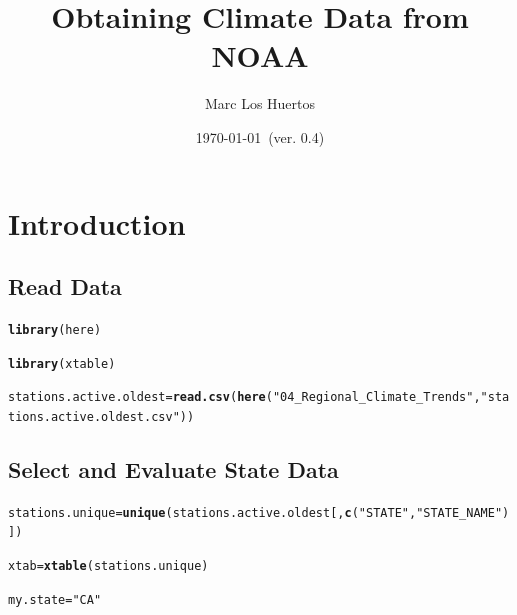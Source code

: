 \documentclass{article}\usepackage[]{graphicx}\usepackage[]{xcolor}
\title{Obtaining Climate Data from NOAA}
\author{Marc Los Huertos}
\date{\today~(ver. 0.4)}
\makeatletter
\newcommand{\hlstr}[1]{\textcolor[rgb]{0.192,0.494,0.8}{#1}}%
\newcommand{\hlstd}[1]{\textcolor[rgb]{0.345,0.345,0.345}{#1}}%
\newcommand{\hlkwb}[1]{\textcolor[rgb]{0.69,0.353,0.396}{#1}}%
\newcommand{\hlkwd}[1]{\textcolor[rgb]{0.737,0.353,0.396}{\textbf{#1}}}%
\newenvironment{kframe}{%
 \def\at@end@of@kframe{}%
 \ifinner\ifhmode%
  \def\at@end@of@kframe{\end{minipage}}%
  \begin{minipage}{\columnwidth}%
 \fi\fi%
 \def\FrameCommand##1{\hskip\@totalleftmargin \hskip-\fboxsep
 \colorbox{shadecolor}{##1}\hskip-\fboxsep
     \hskip-\linewidth \hskip-\@totalleftmargin \hskip\columnwidth}%
 \MakeFramed {\advance\hsize-\width
   \@totalleftmargin\z@ \linewidth\hsize
   \@setminipage}}%
 {\par\unskip\endMakeFramed%
 \at@end@of@kframe}
\newenvironment{knitrout}{}{} %
\makeatother
\begin{document}
\maketitle

\section{Introduction}

\subsection{Read Data}

\begin{knitrout}
\color{fgcolor}\begin{kframe}
\begin{alltt}
\hlkwd{library}\hlstd{(here)}
\end{alltt}


{\ttfamily\noindent\itshape\color{messagecolor}{\#\# here() starts at /home/mwl04747/RTricks}}\begin{alltt}
\hlkwd{library}\hlstd{(xtable)}

\hlstd{stations.active.oldest} \hlkwb{=} \hlkwd{read.csv}\hlstd{(}\hlkwd{here}\hlstd{(}\hlstr{"04_Regional_Climate_Trends"}\hlstd{,} \hlstr{"stations.active.oldest.csv"}\hlstd{))}
\end{alltt}
\end{kframe}
\end{knitrout}

\subsection{Select and Evaluate State Data}

\begin{knitrout}
\color{fgcolor}\begin{kframe}
\begin{alltt}
\hlstd{stations.unique} \hlkwb{=} \hlkwd{unique}\hlstd{(stations.active.oldest[,}\hlkwd{c}\hlstd{(}\hlstr{"STATE"}\hlstd{,} \hlstr{"STATE_NAME"}\hlstd{)])}

\hlstd{xtab} \hlkwb{=} \hlkwd{xtable}\hlstd{(stations.unique)}
\end{alltt}
\end{kframe}
\end{knitrout}


\begin{knitrout}
\color{fgcolor}\begin{kframe}
\begin{alltt}
\hlstd{my.state} \hlkwb{=} \hlstr{"CA"}
\end{alltt}
\end{kframe}
\end{knitrout}
\end{document}
